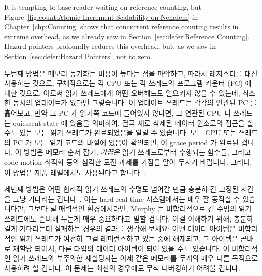 It is tempting to base reader waiting on reference counting, but
Figure~\ref{fig:count:Atomic Increment Scalability on Nehalem}
in
Chapter~\ref{chp:Counting}
shows that concurrent reference counting results in extreme overhead,
as we already saw in
Section~\ref{sec:defer:Reference Counting}.
Hazard pointers profoundly reduces this overhead, but, as we saw in
Section~\ref{sec:defer:Hazard Pointers}, not to zero.
\fi

두번째 방법은 메모리 동기화는 비용이 높다는 점을 파악하고, 따라서 레지스터를
대신 사용하는 것으로, 구체적으로는 각 CPU 또는 각 쓰레드의 프로그램 카운터 (PC)
에 대한 것으로, 이로써 읽기 쓰레드에게 어떤 오버헤드도 일으키지 않을 수 있는데,
최소한 동시의 업데이트가 없다면 그렇습니다.
이 업데이트 쓰레드는 각각의 연관된 PC 를 훑어보고, 만약 그 PC 가 읽기쪽 코드에
들어있지 않다면, 그 연관된 CPU 나 쓰레드는 quiescent state 에 있음을 의미하여,
결국 새로 삭제된 데이터 원소로의 접근을 할수도 있는 모든 읽기 쓰레드가
완료되었음을 알릴 수 있습니다.
모든 CPU 또는 쓰레드의 PC 가 모든 읽기 코드의 바깥에 있음이 확인되면, 이 grace
period 가 완료된 겁니다.
이 방법은 메모리 순서 잡기, \emph{가끔은} 읽기 쓰레드로부터 수행되는 함수들,
그리고 code-motion 최적화 등의 심각한 도전 과제를 가짐을 알아 두시기 바랍니다.
그러나, 이 방법은 제품 레벨에서도 사용된다고 합니다~\cite{MikeAsh2015Apple}.

세번째 방법은 어떤 합리적 읽기 쓰레드의 수명도 넘어갈 만큼 충분히 긴 고정된
시간을 그냥 기다리는 겁니다~\cite{Jacobson93,AjuJohn95}.
이는 hard real-time 시스템에서는 매우 잘 동작할 수 있습니다만, 그보다 덜
매력적인 환경에서라면, Murphy 는 비합리적으로 긴 수명의 읽기 쓰레드에도 준비해
두는게 매우 중요하다고 말할 겁니다.
이걸 이해하기 위해, 충분히 길게 기다리는데 실패하는 경우의 결과를 생각해
보세요: 어떤 데이터 아이템은 비합리적인 읽기 쓰레드가 여전히 그걸 레퍼런스하고
있는 중에 해제되고, 그 아이템은 곧바로 재할당 되어서, 다른 타입의 데이터
아이템이 되어 있을 수도 있습니다.
이 비합리적인 읽기 쓰레드와 부주의한 재할당자는 이제 같은 메모리를 두개의 매우
다른 목적으로 사용하려 할 겁니다.
이 문제는 최선의 경우에도 무척 디버깅하기 어려울 겁니다.
\iffalse

